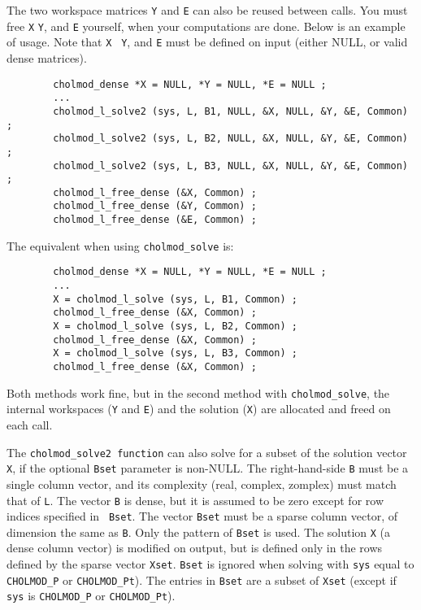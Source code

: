 \documentclass[11pt]{article}
\begin{document}
The two workspace matrices {\tt Y} and {\tt E} can also be reused between
calls.  You must free {\tt X} {\tt Y}, and {\tt E} yourself, when your
computations are done.  Below is an example of usage.  Note that {\tt X} {\tt
Y}, and {\tt E} must be defined on input (either NULL, or valid dense
matrices).

\begin{verbatim}
        cholmod_dense *X = NULL, *Y = NULL, *E = NULL ;
        ...
        cholmod_l_solve2 (sys, L, B1, NULL, &X, NULL, &Y, &E, Common) ;
        cholmod_l_solve2 (sys, L, B2, NULL, &X, NULL, &Y, &E, Common) ;
        cholmod_l_solve2 (sys, L, B3, NULL, &X, NULL, &Y, &E, Common) ;
        cholmod_l_free_dense (&X, Common) ;
        cholmod_l_free_dense (&Y, Common) ;
        cholmod_l_free_dense (&E, Common) ;
\end{verbatim}

The equivalent when using {\tt cholmod\_solve} is:

\begin{verbatim}
        cholmod_dense *X = NULL, *Y = NULL, *E = NULL ;
        ...
        X = cholmod_l_solve (sys, L, B1, Common) ;
        cholmod_l_free_dense (&X, Common) ;
        X = cholmod_l_solve (sys, L, B2, Common) ;
        cholmod_l_free_dense (&X, Common) ;
        X = cholmod_l_solve (sys, L, B3, Common) ;
        cholmod_l_free_dense (&X, Common) ;
\end{verbatim}

Both methods work fine, but in the second method with {\tt cholmod\_solve}, the
internal workspaces ({\tt Y} and {\tt E}) and the solution ({\tt X}) are
allocated and freed on each call.

The {\tt cholmod\_solve2 function} can also solve for a subset of the solution
vector {\tt X}, if the optional {\tt Bset} parameter is non-NULL.  The
right-hand-side {\tt B} must be a single column vector, and its complexity
(real, complex, zomplex) must match that of {\tt L}.  The vector {\tt B} is
dense, but it is assumed to be zero except for row indices specified in {\tt
Bset}.  The vector {\tt Bset} must be a sparse column vector, of dimension the
same as {\tt B}.  Only the pattern of {\tt Bset} is used.  The solution {\tt X}
(a dense column vector) is modified on output, but is defined only in the rows
defined by the sparse vector {\tt Xset}.  {\tt Bset} is ignored when solving
with {\tt sys} equal to {\tt CHOLMOD\_P} or {\tt CHOLMOD\_Pt}).  The entries in
{\tt Bset} are a subset of {\tt Xset} (except if {\tt sys} is {\tt CHOLMOD\_P}
or {\tt CHOLMOD\_Pt}).
\end{document}
